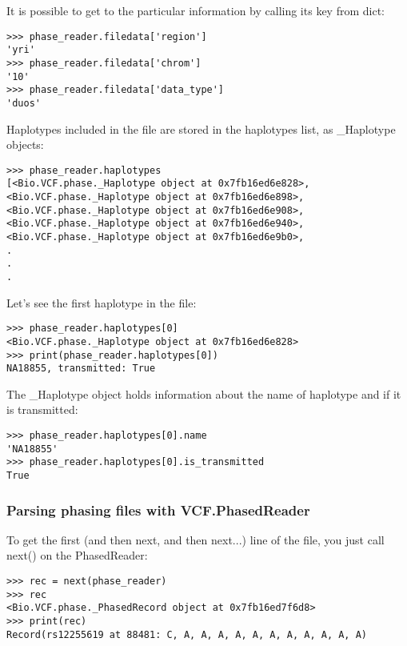 \noindent It is possible to get to the particular information by calling its key from dict:

\begin{verbatim}
>>> phase_reader.filedata['region']
'yri'
>>> phase_reader.filedata['chrom']
'10'
>>> phase_reader.filedata['data_type']
'duos'

\end{verbatim}

\noindent Haplotypes included in the file are stored in the haplotypes list, as \_Haplotype objects:

\begin{verbatim}
>>> phase_reader.haplotypes
[<Bio.VCF.phase._Haplotype object at 0x7fb16ed6e828>,
<Bio.VCF.phase._Haplotype object at 0x7fb16ed6e898>,
<Bio.VCF.phase._Haplotype object at 0x7fb16ed6e908>,
<Bio.VCF.phase._Haplotype object at 0x7fb16ed6e940>,
<Bio.VCF.phase._Haplotype object at 0x7fb16ed6e9b0>,
.
.
.

\end{verbatim}

\noindent Let's see the first haplotype in the file:

\begin{verbatim}
>>> phase_reader.haplotypes[0]
<Bio.VCF.phase._Haplotype object at 0x7fb16ed6e828>
>>> print(phase_reader.haplotypes[0])
NA18855, transmitted: True

\end{verbatim}

\noindent The \_Haplotype object holds information about the name of haplotype and if it is transmitted:

\begin{verbatim}
>>> phase_reader.haplotypes[0].name
'NA18855'
>>> phase_reader.haplotypes[0].is_transmitted
True

\end{verbatim}

\subsubsection{Parsing phasing files with VCF.PhasedReader}

\noindent To get the first (and then next, and then next...) line of the file, you just call next() on the PhasedReader:

\begin{verbatim}
>>> rec = next(phase_reader)
>>> rec
<Bio.VCF.phase._PhasedRecord object at 0x7fb16ed7f6d8>
>>> print(rec)
Record(rs12255619 at 88481: C, A, A, A, A, A, A, A, A, A, A, A)

\end{verbatim}

